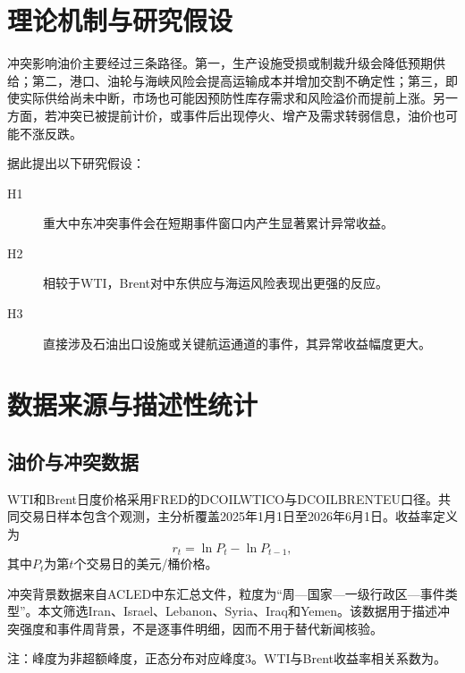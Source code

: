 \documentclass[UTF8,zihao=-4,a4paper]{ctexart}
\begin{document}
\section{理论机制与研究假设}

冲突影响油价主要经过三条路径。第一，生产设施受损或制裁升级会降低预期供给；第二，港口、油轮与海峡风险会提高运输成本并增加交割不确定性；第三，即使实际供给尚未中断，市场也可能因预防性库存需求和风险溢价而提前上涨。另一方面，若冲突已被提前计价，或事件后出现停火、增产及需求转弱信息，油价也可能不涨反跌。

据此提出以下研究假设：

\begin{description}
  \item[H1] 重大中东冲突事件会在短期事件窗口内产生显著累计异常收益。
  \item[H2] 相较于WTI，Brent对中东供应与海运风险表现出更强的反应。
  \item[H3] 直接涉及石油出口设施或关键航运通道的事件，其异常收益幅度更大。
\end{description}

\section{数据来源与描述性统计}

\subsection{油价与冲突数据}

WTI和Brent日度价格采用FRED的DCOILWTICO与DCOILBRENTEU口径\cite{fredwti,fredbrent}。共同交易日样本包含\OilSampleN 个观测，主分析覆盖2025年1月1日至2026年6月1日。收益率定义为
\begin{equation}
  r_t=\ln P_t-\ln P_{t-1},
  \label{eq:return}
\end{equation}
其中$P_t$为第$t$个交易日的美元/桶价格。

冲突背景数据来自ACLED中东汇总文件\cite{acleddata}，粒度为“周—国家—一级行政区—事件类型”。本文筛选Iran、Israel、Lebanon、Syria、Iraq和Yemen。该数据用于描述冲突强度和事件周背景，不是逐事件明细，因而不用于替代新闻核验。

\begin{table}[H]
  \centering
  \caption{WTI与Brent日对数收益率描述性统计（单位：\%）}
  \label{tab:desc}
  \small
  \resizebox{\textwidth}{!}{}
  \begin{minipage}{0.95\textwidth}\footnotesize
  注：峰度为非超额峰度，正态分布对应峰度3。WTI与Brent收益率相关系数为\ReturnCorrelation。
  \end{minipage}
\end{table}
\end{document}
